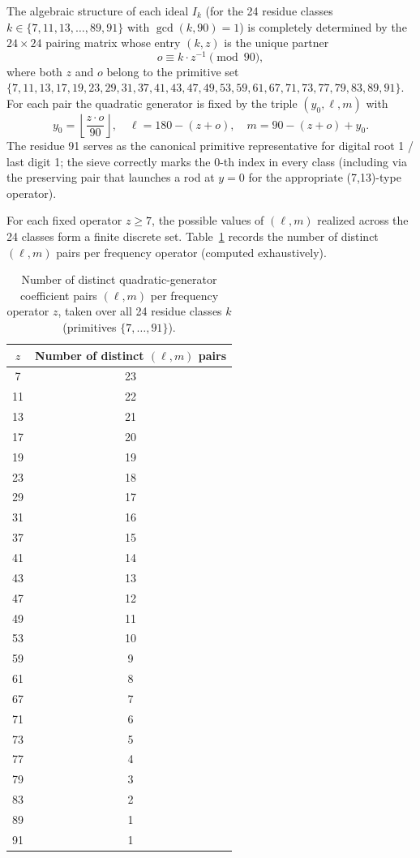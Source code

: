 \documentclass[11pt,a4paper]{article}
\begin{document}
The algebraic structure of each ideal \(I_k\) (for the 24 residue classes \(k \in \{7,11,13,\dots,89,91\}\) with \(\gcd(k,90)=1\)) is completely determined by the \(24 \times 24\) pairing matrix whose entry \((k,z)\) is the unique partner
\[
o \equiv k \cdot z^{-1} \pmod{90},
\]
where both \(z\) and \(o\) belong to the primitive set \(\{7,11,13,17,19,23,29,31,37,41,43,47,49,53,59,61,67,71,73,77,79,83,89,91\}\). For each pair the quadratic generator is fixed by the triple \((y_0, \ell, m)\) with
\[
y_0 = \left\lfloor \frac{z \cdot o}{90} \right\rfloor, \quad \ell = 180 - (z + o), \quad m = 90 - (z + o) + y_0.
\]
The residue 91 serves as the canonical primitive representative for digital root 1 / last digit 1; the sieve correctly marks the 0-th index in every class (including via the preserving pair that launches a rod at \(y=0\) for the appropriate (7,13)-type operator).

For each fixed operator \(z \geq 7\), the possible values of \((\ell, m)\) realized across the 24 classes form a finite discrete set. Table~\ref{tab:lm-per-z} records the number of distinct \((\ell, m)\) pairs per frequency operator (computed exhaustively).

\begin{table}[htbp]
\centering
\begin{tabular}{c|c}
\(z\) & Number of distinct \((\ell, m)\) pairs \\
\hline
7  & 23 \\
11 & 22 \\
13 & 21 \\
17 & 20 \\
19 & 19 \\
23 & 18 \\
29 & 17 \\
31 & 16 \\
37 & 15 \\
41 & 14 \\
43 & 13 \\
47 & 12 \\
49 & 11 \\
53 & 10 \\
59 & 9  \\
61 & 8  \\
67 & 7  \\
71 & 6  \\
73 & 5  \\
77 & 4  \\
79 & 3  \\
83 & 2  \\
89 & 1  \\
91 & 1  \\
\end{tabular}
\caption{Number of distinct quadratic-generator coefficient pairs \((\ell, m)\) per frequency operator \(z\), taken over all 24 residue classes \(k\) (primitives \(\{7,\dots,91\}\)).}
\label{tab:lm-per-z}
\end{table}
\end{document}
